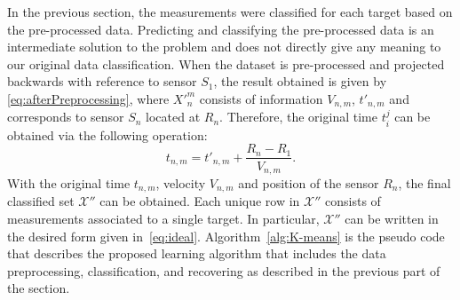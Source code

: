 \documentclass[letterpaper, 10 pt, conference]{ieeeconf}
\begin{document}
In the previous section, the measurements were classified for each target based on the pre-processed data. Predicting and classifying the pre-processed data is an intermediate solution to the problem and does not directly give any meaning to our original data classification. When the dataset is pre-processed and projected backwards with reference to sensor $S_1$, the result obtained is given by \eqref{eq:afterPreprocessing}, where ${X'}_n^m$ consists of information $V_{n,m}$, ${t'}_{n,m}$ and corresponds to sensor $S_n$ located at $R_n$. Therefore, the original time $t_i^j$ can be obtained via the following operation:
\begin{equation*}
t_{n,m} = {t'}_{n,m} + \frac{R_n-R_1}{V_{n,m}}.
\end{equation*}
With the original time $t_{n,m}$, velocity $V_{n,m}$ and position of the sensor $R_n$, the final classified set $\mathcal{X}''$ can be obtained. Each unique row in $\mathcal{X}''$ consists of measurements associated to a single target. In particular, $\mathcal{X}''$ can be written in the desired form given in~\eqref{eq:ideal}. Algorithm~\ref{alg:K-means} is the pseudo code that describes the proposed learning algorithm that includes the data preprocessing, classification, and recovering as described in the previous part of the section.
\end{document}
